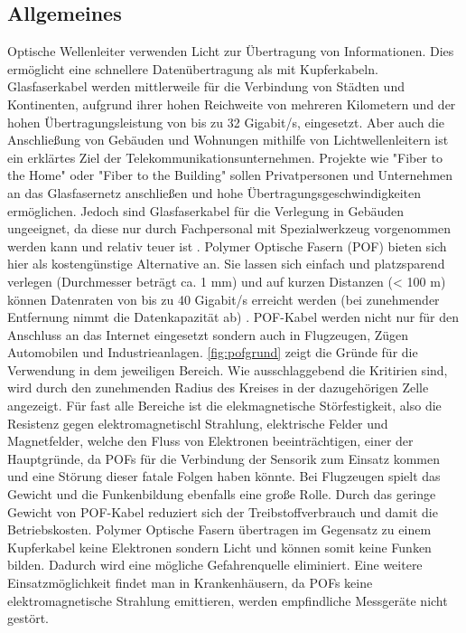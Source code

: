 \subsection{Allgemeines}
\label{subsec:pofallgemeines}

Optische Wellenleiter verwenden Licht zur Übertragung von Informationen. Dies
ermöglicht eine schnellere Datenübertragung als mit Kupferkabeln. Glasfaserkabel
werden mittlerweile für die Verbindung von Städten und Kontinenten, aufgrund
ihrer hohen Reichweite von mehreren Kilometern und der hohen
Übertragungsleistung von bis zu 32 Gigabit/s, eingesetzt. Aber auch die
Anschließung von Gebäuden und Wohnungen mithilfe von Lichtwellenleitern ist ein
erklärtes Ziel der Telekommunikationsunternehmen. Projekte wie
"Fiber to the Home" oder "Fiber
to the Building" sollen Privatpersonen und Unternehmen an das
Glasfasernetz anschließen und hohe Übertragungsgeschwindigkeiten ermöglichen.
Jedoch sind Glasfaserkabel für die Verlegung in Gebäuden ungeeignet, da diese
nur durch Fachpersonal mit Spezialwerkzeug vorgenommen werden kann und relativ
teuer ist \cite{poflan}. Polymer Optische Fasern (POF) bieten sich hier als
kostengünstige Alternative an. Sie lassen sich einfach und platzsparend verlegen
(Durchmesser beträgt ca. 1 mm) und auf kurzen Distanzen (< 100 m) können
Datenraten von bis zu 40 Gigabit/s \cite{pofacgif} erreicht werden (bei
zunehmender Entfernung nimmt die Datenkapazität ab) \cite{pofacprofile}.
POF-Kabel werden nicht nur für den Anschluss an das Internet eingesetzt sondern
auch in Flugzeugen, Zügen Automobilen und Industrieanlagen.
\autoref{fig:pofgrund} zeigt die Gründe für die Verwendung in dem jeweiligen
Bereich. Wie ausschlaggebend die Kritirien sind, wird durch den zunehmenden
Radius des Kreises in der dazugehörigen Zelle angezeigt. Für fast alle Bereiche
ist die elekmagnetische Störfestigkeit, also die Resistenz gegen
elektromagnetischl Strahlung, elektrische Felder und Magnetfelder, welche den
Fluss von Elektronen beeinträchtigen, einer der Hauptgründe, da POFs für die
Verbindung der Sensorik zum Einsatz kommen und eine Störung dieser fatale Folgen
haben könnte. Bei Flugzeugen spielt das Gewicht und die Funkenbildung ebenfalls
eine große Rolle. Durch das geringe Gewicht von POF-Kabel reduziert sich der
Treibstoffverbrauch und damit die Betriebskosten. Polymer Optische Fasern
übertragen im Gegensatz zu einem Kupferkabel keine Elektronen sondern Licht und
können somit keine Funken bilden. Dadurch wird eine mögliche Gefahrenquelle
eliminiert. Eine weitere Einsatzmöglichkeit findet man in Krankenhäusern, da POFs keine elektromagnetische Strahlung emittieren, werden empfindliche Messgeräte nicht gestört.

